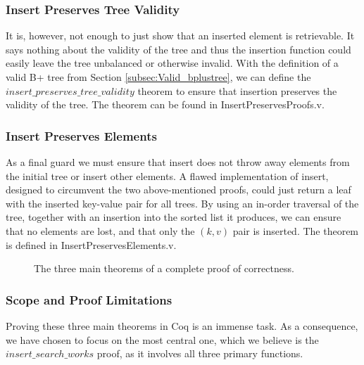 \subsubsection{Insert Preserves Tree Validity}
It is, however, not enough to just show that an inserted element is retrievable. It says nothing about the validity of the tree and thus the insertion function could easily leave the tree unbalanced or otherwise invalid. With the definition of a valid B+ tree from Section \ref{subsec:Valid_bplustree}, we can define the $insert\_preserves\_tree\_validity$ theorem to ensure that insertion preserves the validity of the tree. The theorem can be found in InsertPreservesProofs.v.

\subsubsection{Insert Preserves Elements}
As a final guard we must ensure that insert does not throw away elements from the initial tree or insert other elements. A flawed implementation of insert, designed to circumvent the two above-mentioned proofs, could just return a leaf with the inserted key-value pair for all trees. By using an in-order traversal of the tree, together with an insertion into the sorted list it produces, we can ensure that no elements are lost, and that only the $(k, v)$ pair is inserted. The theorem is defined in InsertPreservesElements.v.

\begin{figure}
\centering

\caption{The three main theorems of a complete proof of correctness.}
\label{fig:three_main_proofs}
\end{figure}

\subsubsection{Scope and Proof Limitations}
Proving these three main theorems in Coq is an immense task. As a consequence, we have chosen to focus on the most central one, which we believe is the $insert\_search\_works$ proof, as it involves all three primary functions.

